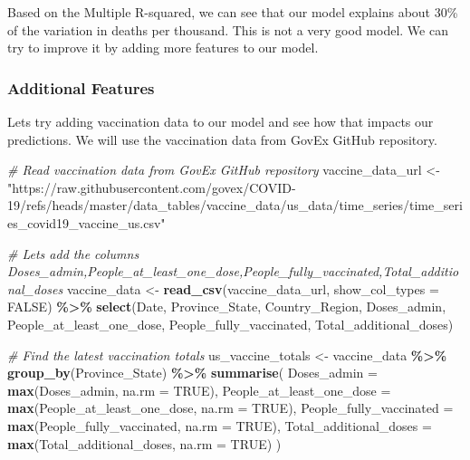 \documentclass[
]{article}
\newenvironment{Shaded}{\begin{snugshade}}{\end{snugshade}}
\newcommand{\AttributeTok}[1]{\textcolor[rgb]{0.13,0.29,0.53}{#1}}
\newcommand{\CommentTok}[1]{\textcolor[rgb]{0.56,0.35,0.01}{\textit{#1}}}
\newcommand{\ConstantTok}[1]{\textcolor[rgb]{0.56,0.35,0.01}{#1}}
\newcommand{\FunctionTok}[1]{\textcolor[rgb]{0.13,0.29,0.53}{\textbf{#1}}}
\newcommand{\NormalTok}[1]{#1}
\newcommand{\OtherTok}[1]{\textcolor[rgb]{0.56,0.35,0.01}{#1}}
\newcommand{\SpecialCharTok}[1]{\textcolor[rgb]{0.81,0.36,0.00}{\textbf{#1}}}
\newcommand{\StringTok}[1]{\textcolor[rgb]{0.31,0.60,0.02}{#1}}
\begin{document}
Based on the Multiple R-squared, we can see that our model explains
about 30\% of the variation in deaths per thousand. This is not a very
good model. We can try to improve it by adding more features to our
model.

\subsubsection{Additional Features}\label{additional-features}

Lets try adding vaccination data to our model and see how that impacts
our predictions. We will use the vaccination data from GovEx GitHub
repository.

\begin{Shaded}
\begin{Highlighting}[]
\CommentTok{\# Read vaccination data from GovEx GitHub repository}
\NormalTok{vaccine\_data\_url }\OtherTok{\textless{}{-}} \StringTok{"https://raw.githubusercontent.com/govex/COVID{-}19/refs/heads/master/data\_tables/vaccine\_data/us\_data/time\_series/time\_series\_covid19\_vaccine\_us.csv"}

\CommentTok{\# Lets add the columns Doses\_admin,People\_at\_least\_one\_dose,People\_fully\_vaccinated,Total\_additional\_doses}
\NormalTok{vaccine\_data }\OtherTok{\textless{}{-}} \FunctionTok{read\_csv}\NormalTok{(vaccine\_data\_url, }\AttributeTok{show\_col\_types =} \ConstantTok{FALSE}\NormalTok{) }\SpecialCharTok{\%\textgreater{}\%}
  \FunctionTok{select}\NormalTok{(Date, Province\_State, Country\_Region, Doses\_admin, People\_at\_least\_one\_dose, People\_fully\_vaccinated, Total\_additional\_doses)}

\CommentTok{\# Find the latest vaccination totals}
\NormalTok{us\_vaccine\_totals }\OtherTok{\textless{}{-}}\NormalTok{ vaccine\_data }\SpecialCharTok{\%\textgreater{}\%}
  \FunctionTok{group\_by}\NormalTok{(Province\_State) }\SpecialCharTok{\%\textgreater{}\%}
  \FunctionTok{summarise}\NormalTok{(}
    \AttributeTok{Doses\_admin =} \FunctionTok{max}\NormalTok{(Doses\_admin, }\AttributeTok{na.rm =} \ConstantTok{TRUE}\NormalTok{),}
    \AttributeTok{People\_at\_least\_one\_dose =} \FunctionTok{max}\NormalTok{(People\_at\_least\_one\_dose, }\AttributeTok{na.rm =} \ConstantTok{TRUE}\NormalTok{),}
    \AttributeTok{People\_fully\_vaccinated =} \FunctionTok{max}\NormalTok{(People\_fully\_vaccinated, }\AttributeTok{na.rm =} \ConstantTok{TRUE}\NormalTok{),}
    \AttributeTok{Total\_additional\_doses =} \FunctionTok{max}\NormalTok{(Total\_additional\_doses, }\AttributeTok{na.rm =} \ConstantTok{TRUE}\NormalTok{)}
\NormalTok{  )}


\end{Highlighting}
\end{Shaded}
\end{document}
